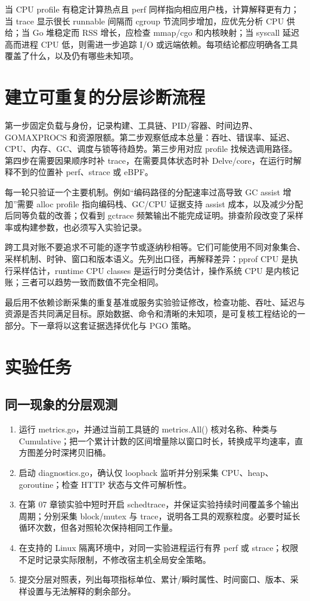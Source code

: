 \documentclass[UTF8,fontset=fandol,openany,11pt]{ctexbook}
\begin{document}
当 CPU profile 有稳定计算热点且 perf 同样指向相应用户栈，计算解释更有力；当 trace 显示很长 runnable 间隔而 cgroup 节流同步增加，应优先分析 CPU 供给；当 Go 堆稳定而 RSS 增长，应检查 mmap/cgo 和内核映射；当 syscall 延迟高而进程 CPU 低，则需进一步追踪 I/O 或远端依赖。每项结论都应明确各工具覆盖了什么，以及仍有哪些未知项。

\section{建立可重复的分层诊断流程}
第一步固定负载与身份，记录构建、工具链、PID/容器、时间边界、GOMAXPROCS 和资源限额。第二步观察低成本总量：吞吐、错误率、延迟、CPU、内存、GC、调度与锁等待趋势。第三步用对应 profile 找候选调用路径。第四步在需要因果顺序时补 trace，在需要具体状态时补 Delve/core，在运行时解释不到的位置补 perf、strace 或 eBPF。

每一轮只验证一个主要机制。例如“编码路径的分配速率过高导致 GC assist 增加”需要 alloc profile 指向编码栈、GC/CPU 证据支持 assist 成本，以及减少分配后同等负载的改善；仅看到 gctrace 频繁输出不能完成证明。排查阶段改变了采样率或构建参数，也必须写入实验记录。

跨工具对账不要追求不可能的逐字节或逐纳秒相等。它们可能使用不同对象集合、采样机制、时钟、窗口和版本语义。先列出口径，再解释差异：pprof CPU 是执行采样估计，runtime CPU classes 是运行时分类估计，操作系统 CPU 是内核记账；三者可以趋势一致而数值不完全相同。

最后用不依赖诊断采集的重复基准或服务实验验证修改，检查功能、吞吐、延迟与资源是否共同满足目标。原始数据、命令和清晰的未知项，是可复核工程结论的一部分。下一章将以这套证据选择优化与 PGO 策略。

\section{实验任务}
\subsection*{同一现象的分层观测}
\begin{enumerate}
\item 运行 metrics.go，并通过当前工具链的 metrics.All() 核对名称、种类与 Cumulative；把一个累计计数的区间增量除以窗口时长，转换成平均速率，直方图差分时深拷贝旧桶。

\item 启动 diagnostics.go，确认仅 loopback 监听并分别采集 CPU、heap、goroutine；检查 HTTP 状态与文件可解析性。

\item 在第 07 章锁实验中短时开启 schedtrace，并保证实验持续时间覆盖多个输出周期；分别采集 block/mutex 与 trace，说明各工具的观察粒度。必要时延长循环次数，但各对照轮次保持相同工作量。

\item 在支持的 Linux 隔离环境中，对同一实验进程运行有界 perf 或 strace；权限不足时记录实际限制，不修改宿主机全局安全策略。

\item 提交分层对照表，列出每项指标单位、累计/瞬时属性、时间窗口、版本、采样设置与无法解释的剩余部分。

\end{enumerate}
\end{document}
